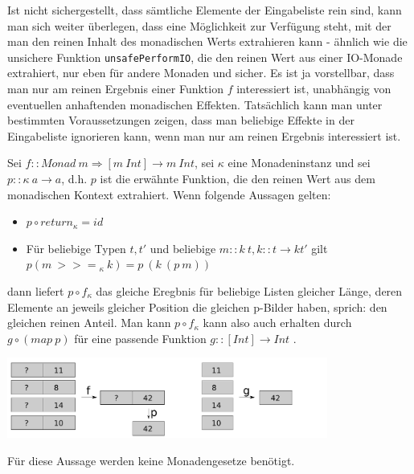Ist nicht sichergestellt, dass sämtliche Elemente der Eingabeliste rein sind, kann man sich weiter überlegen, dass eine
Möglichkeit zur Verfügung steht, mit der man den reinen Inhalt des monadischen Werts extrahieren kann - ähnlich wie
die unsichere Funktion \texttt{unsafePerformIO}, die den reinen Wert aus einer IO-Monade extrahiert, nur eben für
andere Monaden und sicher.
Es ist ja vorstellbar, dass man nur am reinen Ergebnis einer Funktion $f$ interessiert ist, unabhängig von eventuellen anhaftenden
monadischen Effekten. Tatsächlich kann man unter bestimmten Voraussetzungen zeigen, dass man beliebige Effekte in der 
Eingabeliste ignorieren kann, wenn man nur am reinen Ergebnis interessiert ist.

Sei $f :: Monad\ m \Rightarrow [m\ Int] \rightarrow m\ Int$, sei $\kappa$ eine Monadeninstanz und sei $p :: \kappa\ a \rightarrow a$, d.h. $p$ ist die erwähnte Funktion, die den reinen Wert aus dem monadischen Kontext extrahiert.
Wenn folgende Aussagen gelten:

\begin{itemize}
\item $p \circ return_{\kappa} = id$
\item Für beliebige Typen $t, t'$ und beliebige $m :: k\ t, k :: t \rightarrow k t'$ gilt\\
$p (m\ {>>=}_{\kappa}\ k) = p\ (k\ (p\ m))$
\end{itemize}

dann liefert $p \circ f_{\kappa}$ das gleiche Eregbnis für beliebige Listen gleicher Länge, deren Elemente an jeweils gleicher Position
die gleichen p-Bilder haben, sprich: den gleichen reinen Anteil. Man kann $p \circ f_{\kappa}$ kann also auch erhalten durch
$g \circ (map\ p)$ für eine passende Funktion $g :: [Int] \rightarrow Int$ \cite{voigtlander}.

\includegraphics[height=100px]{safe-value-extraction}

Für diese Aussage werden keine Monadengesetze benötigt.